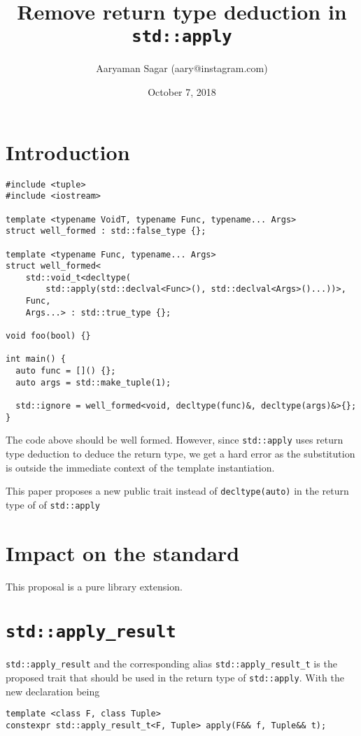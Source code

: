 \documentclass{article}
\begin{document}
\title{\textbf{Remove return type deduction in \texttt{std::apply}}}
\author{Aaryaman Sagar (aary@instagram.com)}
\date{October 7, 2018}
\maketitle

\section{Introduction}

\begin{lstlisting}
#include <tuple>
#include <iostream>

template <typename VoidT, typename Func, typename... Args>
struct well_formed : std::false_type {};

template <typename Func, typename... Args>
struct well_formed<
    std::void_t<decltype(
        std::apply(std::declval<Func>(), std::declval<Args>()...))>,
    Func,
    Args...> : std::true_type {};

void foo(bool) {}

int main() {
  auto func = []() {};
  auto args = std::make_tuple(1);

  std::ignore = well_formed<void, decltype(func)&, decltype(args)&>{};
}
\end{lstlisting}

The code above should be well formed.  However, since \texttt{std::apply} uses
return type deduction to deduce the return type, we get a hard error as the
substitution is outside the immediate context of the template instantiation.

This paper proposes a new public trait instead of \texttt{decltype(auto)} in
the return type of of \texttt{std::apply}

\section{Impact on the standard}
This proposal is a pure library extension.

\section{\texttt{std::apply\_result}}
\texttt{std::apply\_result} and the corresponding alias
\texttt{std::apply\_result\_t} is the proposed trait that should be used in
the return type of \texttt{std::apply}.  With the new declaration being

\begin{lstlisting}
template <class F, class Tuple>
constexpr std::apply_result_t<F, Tuple> apply(F&& f, Tuple&& t);
\end{lstlisting}
\end{document}
